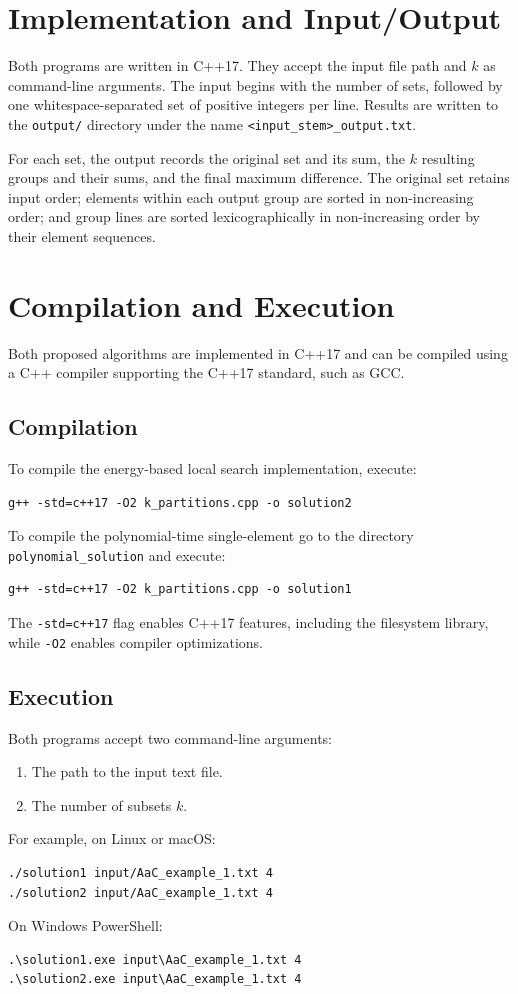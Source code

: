 \documentclass[11pt,a4paper]{article}
\begin{document}
\section{Implementation and Input/Output}
Both programs are written in C++17. They accept the input file path and $k$ as command-line arguments. The input begins with the number of sets, followed by one whitespace-separated set of positive integers per line. Results are written to the \texttt{output/} directory under the name \texttt{<input\_stem>\_output.txt}.

For each set, the output records the original set and its sum, the $k$ resulting groups and their sums, and the final maximum difference. The original set retains input order; elements within each output group are sorted in non-increasing order; and group lines are sorted lexicographically in non-increasing order by their element sequences.

\section{Compilation and Execution}
Both proposed algorithms are implemented in C++17 and can be compiled using a C++ compiler supporting the C++17 standard, such as GCC.
\subsection{Compilation}
To compile the energy-based local search implementation, execute:
\begin{verbatim}
g++ -std=c++17 -O2 k_partitions.cpp -o solution2
\end{verbatim}
To compile the polynomial-time single-element go to the directory \texttt{polynomial\_solution} and execute:
\begin{verbatim}
g++ -std=c++17 -O2 k_partitions.cpp -o solution1
\end{verbatim}
The \texttt{-std=c++17} flag enables C++17 features, including the filesystem library, while \texttt{-O2} enables compiler optimizations.
\subsection{Execution}
Both programs accept two command-line arguments:
\begin{enumerate}
\item The path to the input text file.
\item The number of subsets $k$.
\end{enumerate}
For example, on Linux or macOS:
\begin{verbatim}
./solution1 input/AaC_example_1.txt 4
./solution2 input/AaC_example_1.txt 4
\end{verbatim}
On Windows PowerShell:
\begin{verbatim}
.\solution1.exe input\AaC_example_1.txt 4
.\solution2.exe input\AaC_example_1.txt 4
\end{verbatim}
\end{document}
